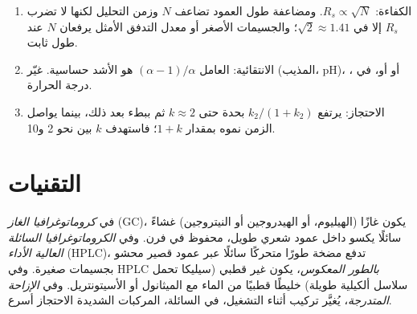 \begin{method}\label{met:b2:chromatography:improve-resolution}
\begin{enumerate}
  \item الكفاءة: $R_s \propto \sqrt N$. ومضاعفة طول العمود تضاعف $N$ وزمن التحليل
        لكنها لا تضرب $R_s$ إلا في $\sqrt2 \approx 1.41$؛ والجسيمات الأصغر أو معدل التدفق الأمثل
        يرفعان $N$ عند طول ثابت.
  \item الانتقائية: العامل $(\alpha - 1)/\alpha$ هو الأشد حساسية. غيّر 
        (المذيب، pH)، أو  أو، في ، درجة الحرارة.
  \item الاحتجاز: يرتفع $k_2/(1+k_2)$ بحدة حتى $k \approx 2$ ثم ببطء بعد ذلك، بينما يواصل الزمن
        نموه بمقدار $1 + k$؛ فاستهدف $k$ بين نحو 2 و10.
\end{enumerate}
\end{method}

\section{التقنيات}

\begin{definition}\label{def:b2:chromatography:techniques}
في \emph{كروماتوغرافيا الغاز} (GC)، يكون  غازًا (الهيليوم، أو الهيدروجين
أو النيتروجين)  غشاءً سائلًا يكسو داخل عمود شعري طويل، محفوظ
في فرن. وفي \emph{الكروماتوغرافيا السائلة العالية الأداء}
(HPLC)، تدفع مضخة طورًا متحركًا سائلًا عبر عمود قصير محشو بجسيمات
صغيرة. وفي HPLC \emph{بالطور المعكوس}، يكون  غير قطبي
(سيليكا تحمل سلاسل ألكيلية طويلة)  خليطًا قطبيًا من الماء مع الميثانول أو
الأسيتونتريل. وفي \emph{الإزاحة المتدرجة}، يُغيَّر تركيب 
أثناء التشغيل، في  السائلة،  المركبات الشديدة الاحتجاز أسرع.
\end{definition}

